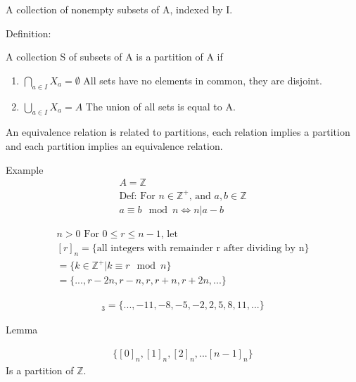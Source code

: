 \documentclass{report}
\begin{document}
\begin{description}
        A collection of nonempty subsets of A, indexed by I.

        Definition:
        \begin{mdframed}
            A collection S of subsets of A is
            a partition of A if 

            \begin{enumerate}
                \item $\bigcap_{a \in I} X_a = \emptyset$ All sets have
                    no elements in common, they are disjoint.

                \item $\bigcup_{a \in I} X_a = A$ The union of all
                    sets is equal to A.
            \end{enumerate}
        \end{mdframed}

        An equivalence relation is related to partitions,
        each relation implies a partition and each partition
        implies an equivalence relation.
    
    \item Example
        \begin{gather}
            A = \mathbb{Z}\\
            \text{Def: For $n \in \mathbb{Z}^+$, and $a, b \in \mathbb{Z}$}\\
            a \equiv b \mod n \iff n | a - b
        \end{gather}

        \begin{gather}
            n > 0 \text{ For $0 \leq r \leq n - 1$, let}\\ 
            [r]_n = \{ \text{all integers with remainder r after
            dividing by n} \}\\
            = \{k \in \mathbb{Z}^+ | k \equiv r \mod n \}\\
            = \{..., r - 2n, r - n, r, r + n, r + 2n, ... \}
        \end{gather}

        \begin{gather}
            [2]_3 = \{..., -11, -8, -5, -2, 2, 5, 8, 11, ... \}
        \end{gather}
        
        {\large Lemma}
        \begin{mdframed}
            \begin{gather}
                \{[0]_n, [1]_n, [2]_n, ... [n-1]_n \} 
            \end{gather}
            Is a partition of $\mathbb{Z}$.
        \end{mdframed}


\end{description}
\end{document}
